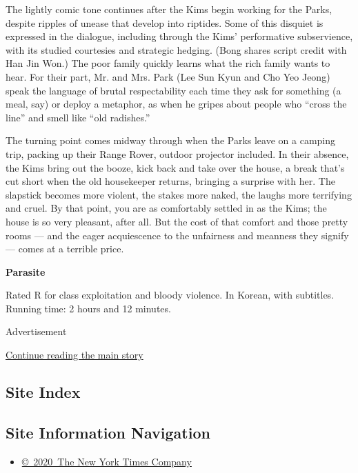 The lightly comic tone continues after the Kims begin working for the
Parks, despite ripples of unease that develop into riptides. Some of
this disquiet is expressed in the dialogue, including through the Kims'
performative subservience, with its studied courtesies and strategic
hedging. (Bong shares script credit with Han Jin Won.) The poor family
quickly learns what the rich family wants to hear. For their part, Mr.
and Mrs. Park (Lee Sun Kyun and Cho Yeo Jeong) speak the language of
brutal respectability each time they ask for something (a meal, say) or
deploy a metaphor, as when he gripes about people who ``cross the line''
and smell like ``old radishes.''

The turning point comes midway through when the Parks leave on a camping
trip, packing up their Range Rover, outdoor projector included. In their
absence, the Kims bring out the booze, kick back and take over the
house, a break that's cut short when the old housekeeper returns,
bringing a surprise with her. The slapstick becomes more violent, the
stakes more naked, the laughs more terrifying and cruel. By that point,
you are as comfortably settled in as the Kims; the house is so very
pleasant, after all. But the cost of that comfort and those pretty rooms
--- and the eager acquiescence to the unfairness and meanness they
signify --- comes at a terrible price.

\textbf{Parasite}

Rated R for class exploitation and bloody violence. In Korean, with
subtitles. Running time: 2 hours and 12 minutes.

Advertisement

\protect\hyperlink{after-bottom}{Continue reading the main story}

\hypertarget{site-index}{%
\subsection{Site Index}\label{site-index}}

\hypertarget{site-information-navigation}{%
\subsection{Site Information
Navigation}\label{site-information-navigation}}

\begin{itemize}
\tightlist
\item
  \href{https://help.nytimes.com/hc/en-us/articles/115014792127-Copyright-notice}{©~2020~The
  New York Times Company}
\end{itemize}

